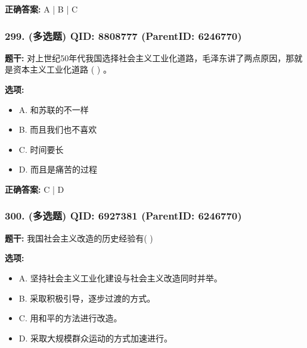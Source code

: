 \documentclass[12pt,UTF8]{ctexart}
\begin{document}
\textbf{正确答案:}
A | B | C

\vspace{0.3em}\hrulefill\vspace{0.7em}

\subsubsection*{299. (多选题) \small QID: 8808777 (ParentID: 6246770)}

\textbf{题干:}
对上世纪50年代我国选择社会主义工业化道路，毛泽东讲了两点原因，那就是资本主义工业化道路 ( ) 。



\textbf{选项:}
\begin{itemize}[leftmargin=*]

  \item A. 和苏联的不一样

  \item B. 而且我们也不喜欢

  \item C. 时间要长

  \item D. 而且是痛苦的过程

\end{itemize}

\textbf{正确答案:}
C | D

\vspace{0.3em}\hrulefill\vspace{0.7em}

\subsubsection*{300. (多选题) \small QID: 6927381 (ParentID: 6246770)}

\textbf{题干:}
我国社会主义改造的历史经验有(      )



\textbf{选项:}
\begin{itemize}[leftmargin=*]

  \item A. 坚持社会主义工业化建设与社会主义改造同时并举。

  \item B. 采取积极引导，逐步过渡的方式。

  \item C. 用和平的方法进行改造。

  \item D. 采取大规模群众运动的方式加速进行。

\end{itemize}
\end{document}
